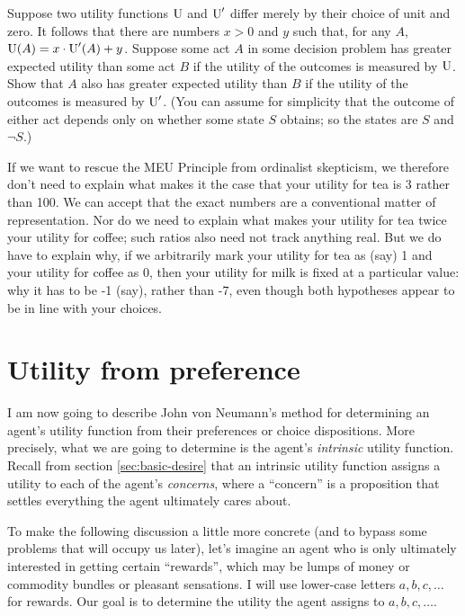 \begin{exercise}{2}
  Suppose two utility functions $\text{U}$ and $\text{U}'$ differ merely by their
  choice of unit and zero. It follows that there are numbers $x>0$ and
  $y$ such that, for any $A$, $\text{U}(A) = x\cdot \text{U}'(A) + y$.%
  Suppose some act $A$ in some decision problem has greater expected
  utility than some act $B$ if the utility of the outcomes is
  measured by $\text{U}$. Show that $A$ also has greater expected utility
  than $B$ if the utility of the outcomes is measured by $\text{U}'$. (You can
  assume for simplicity that the outcome of either act depends only on
  whether some state $S$ obtains; so the states are $S$ and $\neg
  S$.)
\end{exercise}
  
If we want to rescue the MEU Principle from ordinalist skepticism, we therefore
don't need to explain what makes it the case that your utility for tea is 3
rather than 100. We can accept that the exact numbers are a conventional matter
of representation. Nor do we need to explain what makes your utility for tea
twice your utility for coffee; such ratios also need not track anything real.
But we do have to explain why, if we arbitrarily mark your utility for tea as
(say) 1 and your utility for coffee as 0, then your utility for milk is fixed at
a particular value: why it has to be -1 (say), rather than -7, even though both
hypotheses appear to be in line with your choices.

\section{Utility from preference}

I am now going to describe John von Neumann's method for determining an agent's
utility function from their preferences or choice dispositions. More precisely,
what we are going to determine is the agent's \emph{intrinsic} utility function.
Recall from section \ref{sec:basic-desire} that an intrinsic utility function
assigns a utility to each of the agent's \emph{concerns}, where a ``concern'' is
a proposition that settles everything the agent ultimately cares about.

To make the following discussion a little more concrete (and to bypass some
problems that will occupy us later), let's imagine an agent who is only
ultimately interested in getting certain ``rewards'', which may be lumps of
money or commodity bundles or pleasant sensations. I will use lower-case letters
$a,b,c,\ldots$ for rewards. Our goal is to determine the utility the agent
assigns to $a,b,c,\ldots$.

